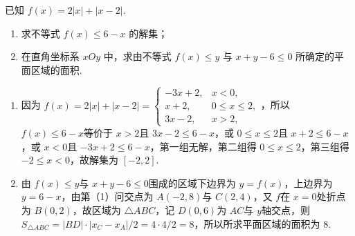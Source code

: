 \begin{problem}
已知 \(f(x)=2|x|+|x-2|\).

\begin{enumerate}
\item 求不等式 \(f(x)\le6-x\) 的解集；
\item 在直角坐标系 \(xOy\) 中，求由不等式 \(f(x)\le y\) 与 \(x+y-6\le0\) 所确定的平面区域的面积.
\end{enumerate}
\end{problem}

\begin{solution}
\begin{enumerate}\item 因为 \(f\left(x\right)=2\left|x\right|+\left|x-2\right|=\begin{cases}
-3x+2,&x<0,\\
x+2,&0\le x\le 2,\\
3x-2,&x>2,
\end{cases}\)，所以 \(f\left(x\right)\le 6-x\)等价于 \(x>2\)且 \(3x-2\le 6-x\)，或 \(0\le x\le 2\)且 \(x+2\le 6-x\)，或 \(x<0\)且 \(-3x+2\le 6-x\)，第一组无解，第二组得 \(0\le x\le 2\)，第三组得 \(-2\le x<0\)，故解集为 \(\left[-2,2\right]\).\item 由 \(f\left(x\right)\le y\)与 \(x+y-6\le 0\)围成的区域下边界为 \(y=f\left(x\right)\)，上边界为 \(y=6-x\)，由第（1）问交点为 \(A\left(-2,8\right)\)与 \(C\left(2,4\right)\)，又 \(f\)在 \(x=0\)处折点为 \(B\left(0,2\right)\)，故区域为 \(\triangle ABC\)，记 \(D\left(0,6\right)\)为 \(AC\)与 \(y\)轴交点，则 \(S_{\triangle ABC}=\left|BD\right|\cdot\left|x_{C}-x_{A}\right|/2=4\cdot 4/2=8\)，所以所求平面区域的面积为 \(8\).\end{enumerate}
\end{solution}
